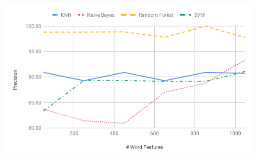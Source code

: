 \documentclass[12pt]{article}
\newenvironment{Figure}
  {\par\medskip\noindent\minipage{\linewidth}}
  {\endminipage\par\medskip}
\begin{document}
        \begin{Figure}
            \centering
            \includegraphics[width=\linewidth]{figures/precision_wv_effect.png}
            \label{fig:precision_word_effect}
        \end{Figure}
\end{document}
